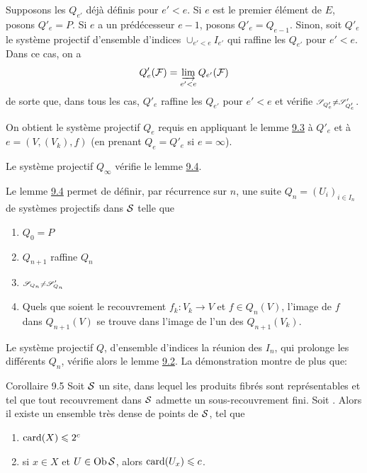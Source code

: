 \documentclass[10pt]{../fichiers-configuration-latex/smfart}
\begin{document}
Supposons les $Q_{e'}$ déjà définis pour $e'< e$. Si $e$ est le
premier élément de $E$, posons $Q'_e = P$. Si $e$ a un prédécesseur
$e-1$, posons $Q'_e = Q_{e-1}$. Sinon, soit $Q'_e$ le système
projectif d'ensemble d'indices $\cup_{e' < e}
I_{e'}$ qui raffine les $Q_{e'}$ pour $e' < e$. Dans ce cas, on a
$$
Q'_e (\Ff) = \varinjlim_{e' < e} Q_{e'} (\Ff)
$$
de \pageoriginale sorte que, dans tous les cas, $Q'_e$ raffine les
$Q_{e'}$ pour $e'< e$ et vérifie $\ss_{Q'_e} \neq \ss'_{Q'_e}$.

On obtient le système projectif $Q_e$ requis en appliquant le lemme
\hyperref[VI.lem9.3]{9.3} à $Q'_e$ et à $e = (V, (V_k), f)$ (\resp en prenant $Q_e =
Q'_e$ si $e = \infty$).

Le système projectif $Q_{\infty}$ vérifie le lemme \hyperref[VI.lem9.4]{9.4}.

Le lemme \hyperref[VI.lem9.4]{9.4} permet de définir, par récurrence sur $n$, une suite
$Q_n = (U_i)_{i \in I_n}$ de systèmes projectifs dans $\Ss$ telle que
\begin{enumerate}
\renewcommand{\theenumi}{\roman{enumi}}
\renewcommand{\labelenumi}{(\theenumi)}
\item $Q_0 = P$

\item $Q_{n+1}$ raffine $Q_n$

\item $\ss_{Q_n} \neq \ss'_{Q_n}$

\item Quels que soient le recouvrement $f_k : V_k \to V$ et $f \in Q_n
  (V)$, l'image de $f$ dans $Q_{n+1} (V)$ se trouve dans l'image de
  l'un des $Q_{n+1} (V_k)$.
\end{enumerate}

Le système projectif $Q$, d'ensemble d'indices la réunion des $I_n$,
qui prolonge les différents $Q_n$, vérifie alors le lemme \hyperref[VI.lem9.2]{9.2}. La
démonstration montre de plus que:

\begin{enonce*}{Corollaire 9.5}
Soit $\Ss$ un site, dans lequel les produits fibrés sont représentables
et tel que tout recouvrement dans $\Ss$ admette un sous-recouvrement
fini. Soit . Alors il existe un ensemble très dense de points de
$\Ss$, tel que
\begin{enumerate}
\renewcommand{\theenumi}{\roman{enumi}}
\renewcommand{\labelenumi}{(\theenumi)}
\item $\card(X) \leq 2^c$

\item si $x \in X$ et $U \in \Ob \Ss$, alors $\card(U_x) \leq c$.
\end{enumerate}
\end{enonce*}
\end{document}
